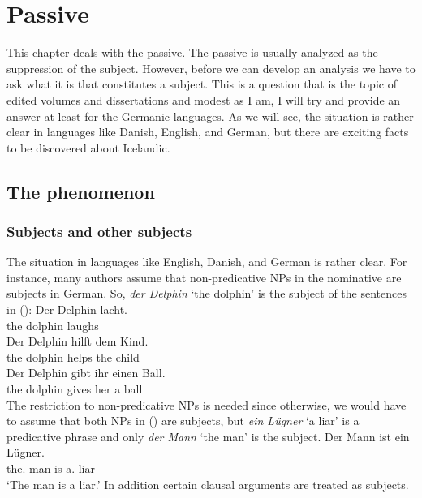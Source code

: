 \chapter{Passive}
\label{sec-icelandic-quirky-subj}
\label{chap-case}


This chapter deals with the passive. The passive is usually analyzed as the suppression of the
subject. However, before we can develop an analysis we have to ask what it is that constitutes a
subject. This is a question that is the topic of edited volumes and dissertations and modest as I
am, I will try and provide an answer at least for the Germanic languages. As we will see, the
situation is rather clear in languages like Danish, English, and German, but there are exciting
facts to be discovered about Icelandic. 


\section{The phenomenon}


\subsection{Subjects and other subjects}
\label{sec-subj-properties}

The situation in languages like English, Danish, and German is rather clear. For instance, many
authors assume that non-predicative NPs in the nominative are subjects in German. So, \emph{der
  Delphin} `the dolphin' is the subject of the sentences in (): 
\eal
\ex 
\gll Der Delphin lacht.\\
     the dolphin laughs\\\german
\ex 
\gll Der Delphin hilft dem Kind.\\
     the dolphin helps the child\\
\ex 
\gll Der Delphin gibt  ihr einen Ball.\\
     the dolphin gives her a ball\\
\zl
The restriction to non-predicative NPs is needed since otherwise, we would have to assume that both
NPs in () are subjects, but \emph{ein Lügner} `a liar' is a predicative phrase and only
\emph{der Mann} `the man' is the subject.
\ea
\gll Der Mann ist ein Lügner.\\
     the.\NOM{} man is a.\NOM{} liar\\\german
\glt `The man is a liar.'
\z
In addition certain clausal arguments are treated as subjects.

